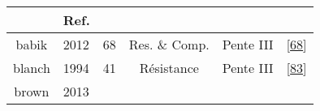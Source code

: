 \documentclass[12pt,]{article}
\begin{document}
\begin{landscape}
\begin{longtable}[]{@{}cllccl@{}}
\begin{minipage}[b]{0.40\columnwidth}
\end{minipage} & \begin{minipage}[b]{0.08\columnwidth}\raggedright
Ref.\strut
\end{minipage}\tabularnewline
\midrule
\endhead
\begin{minipage}[t]{0.09\columnwidth}\centering
babik\strut
\end{minipage} & \begin{minipage}[t]{0.05\columnwidth}\raggedright
2012\strut
\end{minipage} & \begin{minipage}[t]{0.08\columnwidth}\raggedright
68\strut
\end{minipage} & \begin{minipage}[t]{0.14\columnwidth}\centering
Res. \& Comp.\strut
\end{minipage} & \begin{minipage}[t]{0.40\columnwidth}\centering
Pente III\strut
\end{minipage} & \begin{minipage}[t]{0.08\columnwidth}\raggedright
{[}\protect\hyperlink{ref-babik2012effects}{68}{]}\strut
\end{minipage}\tabularnewline
\begin{minipage}[t]{0.09\columnwidth}\centering
blanch\strut
\end{minipage} & \begin{minipage}[t]{0.05\columnwidth}\raggedright
1994\strut
\end{minipage} & \begin{minipage}[t]{0.08\columnwidth}\raggedright
41\strut
\end{minipage} & \begin{minipage}[t]{0.14\columnwidth}\centering
Résistance\strut
\end{minipage} & \begin{minipage}[t]{0.40\columnwidth}\centering
Pente III\strut
\end{minipage} & \begin{minipage}[t]{0.08\columnwidth}\raggedright
{[}\protect\hyperlink{ref-blanch1994relationship}{83}{]}\strut
\end{minipage}\tabularnewline
\begin{minipage}[t]{0.09\columnwidth}\centering
brown\strut
\end{minipage} & \begin{minipage}[t]{0.05\columnwidth}\raggedright
2013\strut
\end{minipage} & \begin{minipage}[t]{0.08\columnwidth}\raggedright

\end{minipage}
\end{longtable}
\end{landscape}
\end{document}
